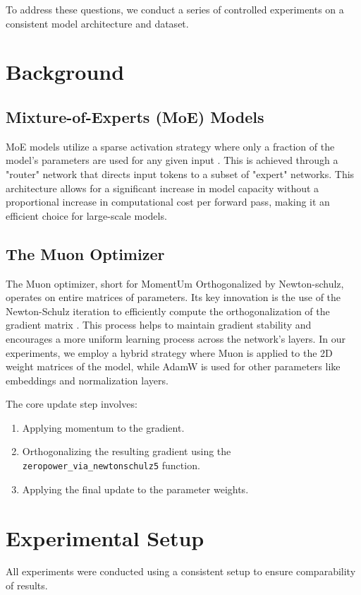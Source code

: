 \documentclass[11pt, a4paper]{article}
\begin{document}
To address these questions, we conduct a series of controlled experiments on a consistent model architecture and dataset.

\section{Background}
\subsection{Mixture-of-Experts (MoE) Models}
MoE models utilize a sparse activation strategy where only a fraction of the model's parameters are used for any given input \cite{shazeer2017outrageously}. This is achieved through a "router" network that directs input tokens to a subset of "expert" networks. This architecture allows for a significant increase in model capacity without a proportional increase in computational cost per forward pass, making it an efficient choice for large-scale models.

\subsection{The Muon Optimizer}
The Muon optimizer, short for MomentUm Orthogonalized by Newton-schulz, operates on entire matrices of parameters. Its key innovation is the use of the Newton-Schulz iteration to efficiently compute the orthogonalization of the gradient matrix \cite{schulz1933iteratives}. This process helps to maintain gradient stability and encourages a more uniform learning process across the network's layers. In our experiments, we employ a hybrid strategy where Muon is applied to the 2D weight matrices of the model, while AdamW is used for other parameters like embeddings and normalization layers.

The core update step involves:
\begin{enumerate}
    \item Applying momentum to the gradient.
    \item Orthogonalizing the resulting gradient using the \texttt{zeropower\_via\_newtonschulz5} function.
    \item Applying the final update to the parameter weights.
\end{enumerate}

\section{Experimental Setup}
All experiments were conducted using a consistent setup to ensure comparability of results.
\end{document}
